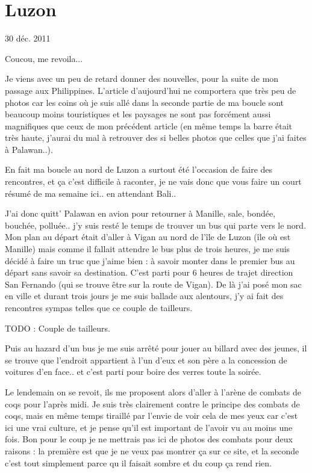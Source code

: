 \section{Luzon}

30 déc. 2011

\begin{multicols}{2}

Coucou, me revoila...

Je viens avec un peu de retard donner des nouvelles, pour la suite de mon passage aux Philippines. L'article d'aujourd'hui ne comportera que très peu de photos car les coins où je suis allé dans la seconde partie de ma boucle sont beaucoup moins touristiques et les paysages ne sont pas forcément aussi magnifiques que ceux de mon précédent article (en même temps la barre était très haute, j'aurai du mal à retrouver des si belles photos que celles que j'ai faites à Palawan..).

En fait ma boucle au nord de Luzon a surtout été l'occasion de faire des rencontres, et ça c'est difficile à raconter, je ne vais donc que vous faire un court résumé de ma semaine ici.. en attendant Bali..

J'ai donc quitt' Palawan en avion pour retourner à Manille, sale, bondée, bouchée, polluée.. j'y suis resté le temps de trouver un bus qui parte vers le nord. Mon plan au départ était d'aller à Vigan au nord de l'île de Luzon (île où est Manille) mais comme il fallait attendre le bus plus de trois heures, je me suis décidé à faire un truc que j'aime bien : à savoir monter dans le premier bus au départ sans savoir sa destination. C'est parti pour 6 heures de trajet direction San Fernando (qui se trouve être sur la route de Vigan). De là j'ai posé mon sac en ville et durant trois jours je me suis ballade aux alentours, j'y ai fait des rencontres sympas telles que ce couple de tailleurs.

TODO : Couple de tailleurs.

Puis au hazard d'un bus je me suis arrêté pour jouer au billard avec des jeunes, il se trouve que l'endroit appartient à l'un d'eux et son père a la concession de voitures d'en face.. et c'est parti pour boire des verres toute la soirée.


Le lendemain on se revoit, ils me proposent alors d'aller à l'arène de combats de coqs pour l'après midi. Je suis très clairement contre le principe des combats de coqs, mais en même temps tiraillé par l'envie de voir cela de mes yeux car c'est ici une vrai culture, et je pense qu'il est important de l'avoir vu au moins une fois. Bon pour le coup je ne mettrais pas ici de photos des combats pour deux raisons : la première est que je ne veux pas montrer ça sur ce site, et la seconde c'est tout simplement parce qu il faisait sombre et du coup ça rend rien.


\end{multicols}
